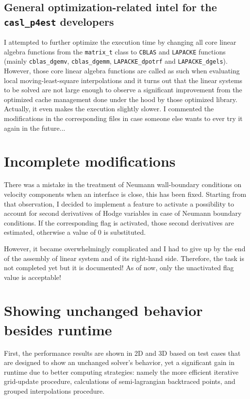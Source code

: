 \documentclass[11pt, a4paper]{article}
\theoremstyle{remark}
\begin{document}
\subsection{General optimization-related intel for the \texttt{casl\_p4est} developers}
I attempted to further optimize the execution time by changing all core linear algebra functions from the \verb|matrix_t| class to \verb|CBLAS| and \verb|LAPACKE| functions (mainly \verb|cblas_dgemv|, \verb|cblas_dgemm|, \verb|LAPACKE_dpotrf| and \verb|LAPACKE_dgels|). However, those core linear algebra functions are called as such when evaluating local moving-least-square interpolations and it turns out that the linear systems to be solved are not large enough to observe a significant improvement from the optimized cache management done under the hood by those optimized library. Actually, it even makes the execution slightly slower. I commented the modifications in the corresponding files in case someone else wants to ever try it again in the future...
\section{Incomplete modifications}

There was a mistake in the treatment of Neumann wall-boundary conditions on velocity components when an interface is close, this has been fixed. Starting from that observation, I decided to implement a feature to activate a possibility to account for second derivatives of Hodge variables in case of Neumann boundary conditions. If the corresponding flag is activated, those second derivatives are estimated, otherwise a value of $0$ is substituted. 

However, it became overwhelmingly complicated and I had to give up by the end of the assembly of linear system and of its right-hand side. Therefore, the task is not completed yet but it is documented! As of now, only the unactivated flag value is acceptable!

\section{Showing unchanged behavior besides runtime}
First, the performance results are shown in 2D and 3D based on test cases that are designed to show an unchanged solver's behavior, yet a significant gain in runtime due to better computing strategies: namely the more efficient iterative grid-update procedure, calculations of semi-lagrangian backtraced points, and grouped interpolations procedure. 
\end{document}
